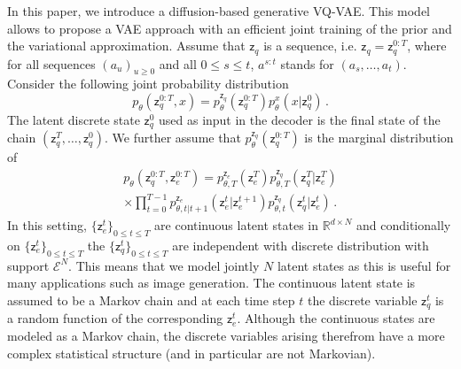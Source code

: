 \documentclass[nohyperref]{article}
\theoremstyle{plain}
\theoremstyle{definition}
\theoremstyle{remark}
\newcommand{\latentcont}{\mathsf{z}_e}
\newcommand{\latentdis}{\mathsf{z}_q}
\newcommand{\embedspace}{\mathcal{E}}
\begin{document}
In this paper, we introduce a diffusion-based generative VQ-VAE. This model allows to propose a VAE approach with an efficient joint training of the prior and the variational approximation. %
Assume that $\latentdis$ is a sequence, i.e.  $\latentdis= \latentdis^{0:T}$, where for all sequences $(a_u)_{u\geqslant 0}$ and all $0\leqslant s\leqslant t$, $a^{s:t}$ stands for $(a_s,\ldots,a_t)$. Consider the following joint probability distribution 
$$
p_{\theta}(\latentdis^{0:T},x) = p^{\latentdis}_{\theta}(\latentdis^{0:T})p^x_{\theta}(x|\latentdis^{0})\,.
$$ 
The latent discrete state $\latentdis^0$ used as input in the decoder  is the final state of the chain $(\latentdis^T,\ldots,\latentdis^0)$. We further assume that $p_{\theta}^{\latentdis}(\latentdis^{0:T})$ is the marginal distribution of  
\begin{multline*}
p_{\theta}(\latentdis^{0:T},\latentcont^{0:T}) %
= p^{\latentcont}_{\theta,T}(\latentcont^T) p^{\latentdis}_{\theta,T}(\latentdis^T|\latentcont^T)\\
\times\prod_{t=0}^{T-1}p^{\latentcont}_{\theta,t|t+1}(\latentcont^t|\latentcont^{t+1})p^{\latentdis}_{\theta,t}(\latentdis^t|\latentcont^t)\,.
\end{multline*}
In this setting, $\{\latentcont^t\}_{0\leqslant t\leqslant T}$ are continuous latent states in $\mathbb{R}^{d\times N}$ and conditionally on $\{\latentcont^t\}_{0\leqslant t\leqslant T}$ the $\{\latentdis^t\}_{0\leqslant t\leqslant T}$ are independent with discrete distribution with support $\embedspace^N$. This means that we model jointly $N$  latent states as this is useful for many applications such as image generation. %
The continuous latent state is assumed to be a Markov chain and at each time step $t$ the discrete variable $\latentdis^t$ is a random function of the corresponding $\latentcont^t$.  Although the continuous states are modeled as a Markov chain, the discrete variables arising therefrom have a more complex statistical structure (and in particular are not Markovian).
\end{document}
